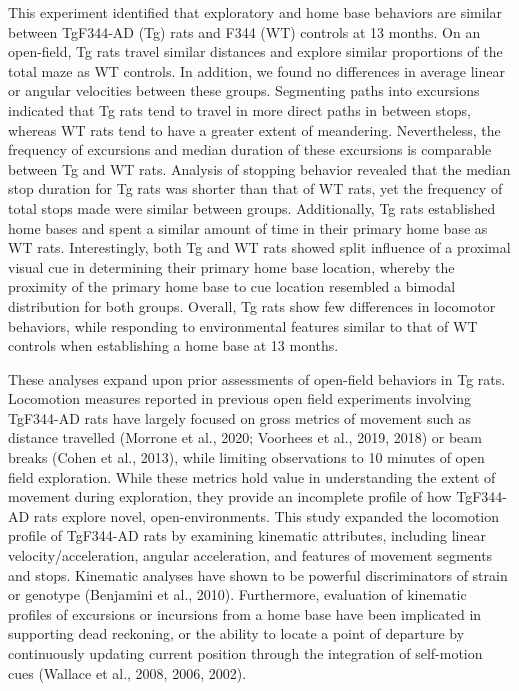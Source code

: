 \documentclass[fleqn,10pt]{wlscirep}
\begin{document}
This experiment identified that exploratory and home base behaviors are similar between TgF344-AD (Tg) rats and F344 (WT) controls at 13 months. On an open-field, Tg rats travel similar distances and explore similar proportions of the total maze as WT controls. In addition, we found no differences in average linear or angular velocities between these groups. Segmenting paths into excursions indicated that Tg rats tend to travel in more direct paths in between stops, whereas WT rats tend to have a greater extent of meandering. Nevertheless, the frequency of excursions and median duration of these excursions is comparable between Tg and WT rats. Analysis of stopping behavior revealed that the median stop duration for Tg rats was shorter than that of WT rats, yet the frequency of total stops made were similar between groups. Additionally, Tg rats established home bases and spent a similar amount of time in their primary home base as WT rats. Interestingly, both Tg and WT rats showed split influence of a proximal visual cue in determining their primary home base location, whereby the proximity of the primary home base to cue location resembled a bimodal distribution for both groups. Overall, Tg rats show few differences in locomotor behaviors, while responding to environmental features similar to that of WT controls when establishing a home base at 13 months. 

These analyses expand upon prior assessments of open-field behaviors in Tg rats. Locomotion measures reported in previous open field experiments involving TgF344-AD rats have largely focused on gross metrics of movement such as distance travelled (Morrone et al., 2020; Voorhees et al., 2019, 2018) or beam breaks (Cohen et al., 2013), while limiting observations to 10 minutes of open field exploration. While these metrics hold value in understanding the extent of movement during exploration, they provide an incomplete profile of how TgF344-AD rats explore novel, open-environments. This study expanded the locomotion profile of TgF344-AD rats by examining kinematic attributes, including linear velocity/acceleration, angular acceleration, and features of movement segments and stops. Kinematic analyses have shown to be powerful discriminators of strain or genotype (Benjamini et al., 2010). Furthermore, evaluation of kinematic profiles of excursions or incursions from a home base have been implicated in supporting dead reckoning, or the ability to locate a point of departure by continuously updating current position through the integration of self-motion cues (Wallace et al., 2008, 2006, 2002). 
\end{document}
